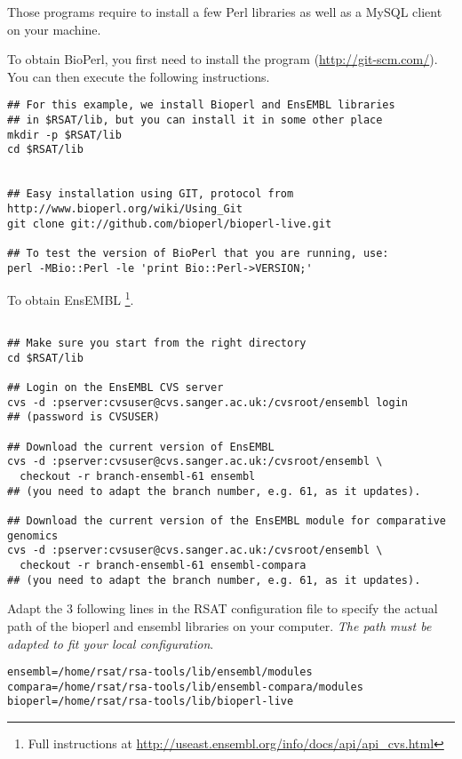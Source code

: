 \documentclass[12pt,a4paper, oneside]{scrreprt} %
\begin{document}
Those programs require to install a few Perl libraries as well as a
MySQL client on your machine. 

To obtain BioPerl, you first need to install the program 
(\url{http://git-scm.com/}). You can then execute the following
instructions.

\begin{lstlisting}
## For this example, we install Bioperl and EnsEMBL libraries 
## in $RSAT/lib, but you can install it in some other place
mkdir -p $RSAT/lib
cd $RSAT/lib


## Easy installation using GIT, protocol from http://www.bioperl.org/wiki/Using_Git
git clone git://github.com/bioperl/bioperl-live.git

## To test the version of BioPerl that you are running, use:
perl -MBio::Perl -le 'print Bio::Perl->VERSION;'
\end{lstlisting}

To obtain EnsEMBL \footnote{Full instructions at
  \url{http://useast.ensembl.org/info/docs/api/api_cvs.html}}.

\begin{lstlisting}

## Make sure you start from the right directory
cd $RSAT/lib

## Login on the EnsEMBL CVS server
cvs -d :pserver:cvsuser@cvs.sanger.ac.uk:/cvsroot/ensembl login
## (password is CVSUSER)

## Download the current version of EnsEMBL
cvs -d :pserver:cvsuser@cvs.sanger.ac.uk:/cvsroot/ensembl \
  checkout -r branch-ensembl-61 ensembl
## (you need to adapt the branch number, e.g. 61, as it updates).

## Download the current version of the EnsEMBL module for comparative genomics
cvs -d :pserver:cvsuser@cvs.sanger.ac.uk:/cvsroot/ensembl \
  checkout -r branch-ensembl-61 ensembl-compara
## (you need to adapt the branch number, e.g. 61, as it updates).
\end{lstlisting}

Adapt the 3 following lines in the RSAT configuration file
 to specify the actual path of the bioperl
and ensembl libraries on your computer. \emph{The path must be adapted
  to fit your local configuration}.

\begin{lstlisting}
ensembl=/home/rsat/rsa-tools/lib/ensembl/modules
compara=/home/rsat/rsa-tools/lib/ensembl-compara/modules
bioperl=/home/rsat/rsa-tools/lib/bioperl-live
\end{lstlisting}
\end{document}
